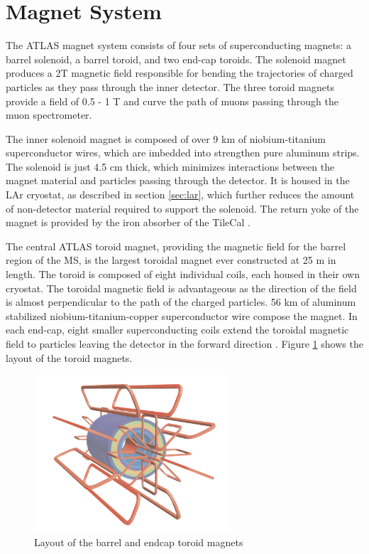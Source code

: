 \section{Magnet System}
\label{sec:magnets}
The ATLAS magnet system consists of four sets of superconducting magnets: a barrel solenoid, a barrel toroid, and two end-cap toroids. The solenoid magnet produces a 2T magnetic field responsible for bending the trajectories of charged particles as they pass through the inner detector. The three toroid magnets provide a field of 0.5 - 1 T and curve the path of muons passing through the muon spectrometer.\par

The inner solenoid magnet is composed of over 9 km of niobium-titanium superconductor wires, which are imbedded into strengthen pure aluminum strips. The solenoid is just 4.5 cm thick, which minimizes interactions between the magnet material and particles passing through the detector. It is housed in the LAr cryostat, as described in section \ref{sec:lar}, which further reduces the amount of non-detector material required to support the solenoid. The return yoke of the magnet is provided by the iron absorber of the TileCal \cite{magnet_tdr}.\par

The central ATLAS toroid magnet, providing the magnetic field for the barrel region of the MS, is the largest toroidal magnet ever constructed at 25 m in length. The toroid is composed of eight individual coils, each housed in their own cryostat. The toroidal magnetic field is advantageous as the direction of the field is almost perpendicular to the path of the charged particles. 56 km of aluminum stabilized niobium-titanium-copper superconductor wire compose the magnet. In each end-cap, eight smaller superconducting coils extend the toroidal magnetic field to particles leaving the detector in the forward direction \cite{magnet_tdr}. Figure \ref{fig:magnets} shows the layout of the toroid magnets.

\begin{figure}
        \centering
	\includegraphics[width=0.65\textwidth]{figures/ch3/magnets.png}
	\caption{Layout of the barrel and endcap toroid magnets \cite{atlas_overview} }
	\label{fig:magnets}
\end{figure}

